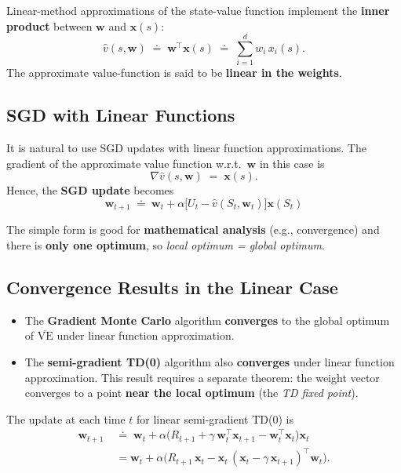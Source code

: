 \documentclass[11pt,a4paper]{article}
\theoremstyle{definition}
\theoremstyle{plain}
\theoremstyle{remark}
\begin{document}
\begin{tcolorbox}[colback=blue!5!white, colframe=blue!60!black, title={Linear State-Value Approximation}]
Linear-method approximations of the state-value function implement the \textbf{inner product} between $\mathbf{w}$ and $\mathbf{x}(s)$:
\[
    \hat{v}(s, \mathbf{w}) \;\doteq\; \mathbf{w}^\top \mathbf{x}(s) \;\doteq\; \sum_{i=1}^{d} w_i\, x_i(s).
\]
The approximate value-function is said to be \textbf{linear in the weights}.
\end{tcolorbox}

\subsection{SGD with Linear Functions}

It is natural to use SGD updates with linear function approximations. The gradient of the approximate value function w.r.t.\ $\mathbf{w}$ in this case is
\[
    \nabla \hat{v}(s, \mathbf{w}) \;=\; \mathbf{x}(s).
\]
Hence, the \textbf{SGD update} becomes
\[
    \boxed{\;\mathbf{w}_{t+1} \;\doteq\; \mathbf{w}_t + \alpha \bigl[U_t - \hat{v}(S_t, \mathbf{w}_t)\bigr] \mathbf{x}(S_t)\;}
\]

The simple form is good for \textbf{mathematical analysis} (e.g., convergence) and there is \textbf{only one optimum}, so \emph{local optimum = global optimum}.

\subsection{Convergence Results in the Linear Case}

\begin{itemize}
    \item The \textbf{Gradient Monte Carlo} algorithm \textbf{converges} to the global optimum of $\overline{\mathrm{VE}}$ under linear function approximation.
    \item The \textbf{semi-gradient TD(0)} algorithm also \textbf{converges} under linear function approximation. This result requires a separate theorem: the weight vector converges to a point \textbf{near the local optimum} (the \emph{TD fixed point}).
\end{itemize}

The update at each time $t$ for linear semi-gradient TD(0) is
\begin{align*}
    \mathbf{w}_{t+1} \;&\doteq\; \mathbf{w}_t + \alpha \bigl(R_{t+1} + \gamma\, \mathbf{w}_t^\top \mathbf{x}_{t+1} - \mathbf{w}_t^\top \mathbf{x}_t\bigr) \mathbf{x}_t \\
                       &= \mathbf{w}_t + \alpha \bigl(R_{t+1}\, \mathbf{x}_t - \mathbf{x}_t\, (\mathbf{x}_t - \gamma\, \mathbf{x}_{t+1})^\top \mathbf{w}_t\bigr).
\end{align*}
\end{document}
